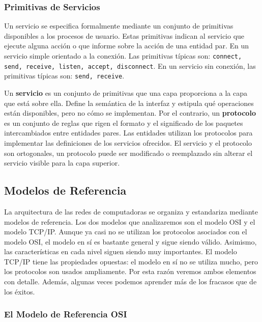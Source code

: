 \subsubsection{Primitivas de Servicios}

Un servicio se especifica formalmente mediante un conjunto de primitivas disponibles a los procesos de usuario. Estas primitivas indican al servicio que ejecute alguna acción o que informe sobre la acción de una entidad par. En un servicio simple orientado a la conexión. Las primitivas típicas son: \texttt{connect, send, receive, listen, accept, disconnect}. En un servicio sin conexión, las primitivas típicas son: \texttt{send, receive}.

\begin{obs}
Un \textbf{servicio} es un conjunto de primitivas que una capa proporciona a la capa que está sobre ella. Define la semántica de la interfaz y estipula qué operaciones están disponibles, pero no cómo se implementan. Por el contrario, un \textbf{protocolo} es un conjunto de reglas que rigen el formato y el significado de los paquetes intercambiados entre entidades pares. Las entidades utilizan los protocolos para implementar las definiciones de los servicios ofrecidos. El servicio y el protocolo son ortogonales, un protocolo puede ser modificado o reemplazado sin alterar el servicio visible para la capa superior.
\end{obs}

\subsection{Modelos de Referencia}

La arquitectura de las redes de computadoras se organiza y estandariza mediante modelos de referencia. Los dos modelos que analizaremos son el modelo OSI y el modelo TCP/IP. Aunque ya casi no se utilizan los protocolos asociados con el modelo OSI, el modelo en sí es bastante general y sigue siendo válido. Asimismo, las características en cada nivel siguen siendo muy importantes. El modelo TCP/IP tiene las propiedades opuestas: el modelo en sí no se utiliza mucho, pero los protocolos son usados ampliamente. Por esta razón veremos ambos elementos con detalle. Además, algunas veces podemos aprender más de los fracasos que de los éxitos.

\subsubsection{El Modelo de Referencia OSI}

